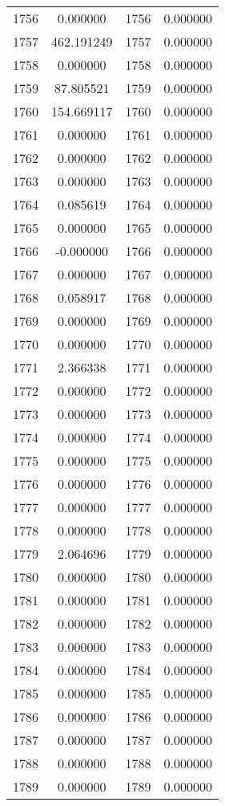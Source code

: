 \documentclass[12pt]{article}
\begin{document}
\begin{longtable}{@{}cccc@{}}
1756 & 0.000000 & 1756 & 0.000000 \\
1757 & 462.191249 & 1757 & 0.000000 \\
1758 & 0.000000 & 1758 & 0.000000 \\
1759 & 87.805521 & 1759 & 0.000000 \\
1760 & 154.669117 & 1760 & 0.000000 \\
1761 & 0.000000 & 1761 & 0.000000 \\
1762 & 0.000000 & 1762 & 0.000000 \\
1763 & 0.000000 & 1763 & 0.000000 \\
1764 & 0.085619 & 1764 & 0.000000 \\
1765 & 0.000000 & 1765 & 0.000000 \\
1766 & -0.000000 & 1766 & 0.000000 \\
1767 & 0.000000 & 1767 & 0.000000 \\
1768 & 0.058917 & 1768 & 0.000000 \\
1769 & 0.000000 & 1769 & 0.000000 \\
1770 & 0.000000 & 1770 & 0.000000 \\
1771 & 2.366338 & 1771 & 0.000000 \\
1772 & 0.000000 & 1772 & 0.000000 \\
1773 & 0.000000 & 1773 & 0.000000 \\
1774 & 0.000000 & 1774 & 0.000000 \\
1775 & 0.000000 & 1775 & 0.000000 \\
1776 & 0.000000 & 1776 & 0.000000 \\
1777 & 0.000000 & 1777 & 0.000000 \\
1778 & 0.000000 & 1778 & 0.000000 \\
1779 & 2.064696 & 1779 & 0.000000 \\
1780 & 0.000000 & 1780 & 0.000000 \\
1781 & 0.000000 & 1781 & 0.000000 \\
1782 & 0.000000 & 1782 & 0.000000 \\
1783 & 0.000000 & 1783 & 0.000000 \\
1784 & 0.000000 & 1784 & 0.000000 \\
1785 & 0.000000 & 1785 & 0.000000 \\
1786 & 0.000000 & 1786 & 0.000000 \\
1787 & 0.000000 & 1787 & 0.000000 \\
1788 & 0.000000 & 1788 & 0.000000 \\
1789 & 0.000000 & 1789 & 0.000000 \\

\end{longtable}
\end{document}

